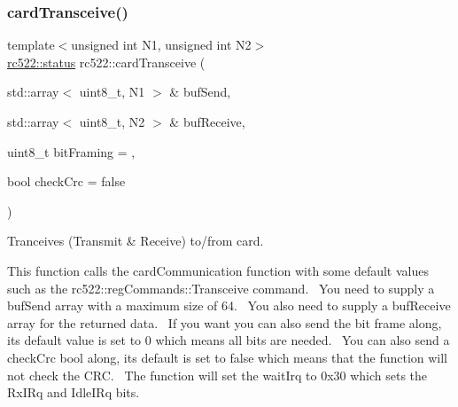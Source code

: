 \subsubsection{\texorpdfstring{card\+Transceive()}{cardTransceive()}\hspace{0.1cm}{\footnotesize\ttfamily [1/2]}}
{\footnotesize\ttfamily template$<$unsigned int N1, unsigned int N2$>$ \\
\hyperlink{classspiReader_a4bcf984823c38cf4841ebf619e788790}{rc522\+::status} rc522\+::card\+Transceive (\begin{DoxyParamCaption}\item[{std\+::array$<$ uint8\+\_\+t, N1 $>$ \&}]{buf\+Send,  }\item[{std\+::array$<$ uint8\+\_\+t, N2 $>$ \&}]{buf\+Receive,  }\item[{uint8\+\_\+t}]{bit\+Framing = {},  }\item[{bool}]{check\+Crc = {\ttfamily false} }\end{DoxyParamCaption})\hspace{0.3cm}{\ttfamily [inline]}}



Tranceives (Transmit \& Receive) to/from card. 

This function calls the card\+Communication function with some default values such as the rc522\+::reg\+Commands\+::\+Transceive command.~\newline
You need to supply a buf\+Send array with a maximum size of 64.~\newline
You also need to supply a buf\+Receive array for the returned data.~\newline
If you want you can also send the bit frame along, its default value is set to 0 which means all bits are needed.~\newline
You can also send a check\+Crc bool along, its default is set to false which means that the function will not check the C\+RC.~\newline
The function will set the wait\+Irq to 0x30 which sets the Rx\+I\+Rq and Idle\+I\+Rq bits. \mbox{\label{classrc522_a4aa6f24387944a7aee98398dd300b7a0}} 
